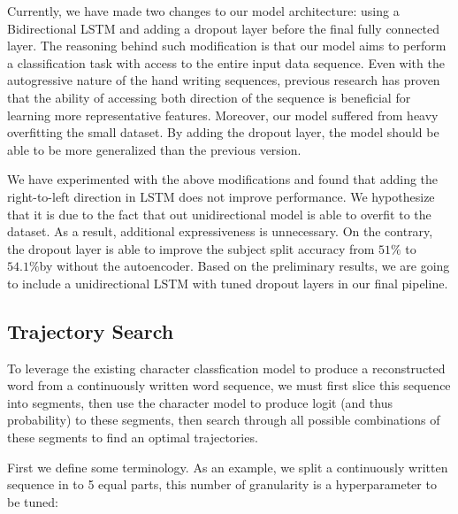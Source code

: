 \documentclass{article}
\begin{document}
\begin{multicols*}{2}
Currently, we have made two changes to our model architecture: using a Bidirectional LSTM and adding a dropout layer before the final fully connected layer. The reasoning behind such modification is that our model aims to perform a classification task with access to the entire input data sequence. Even with the autogressive nature of the hand writing sequences, previous research\cite{bilstm} has proven that the ability of accessing both direction of the sequence is beneficial for learning more representative features. Moreover, our model suffered from heavy overfitting the small dataset. By adding the dropout layer, the model should be able to be more generalized than the previous version.

We have experimented with the above modifications and found that adding the right-to-left direction in LSTM does not improve performance. We hypothesize that it is due to the fact that out unidirectional model is able to overfit to the dataset. As a result, additional expressiveness is unnecessary. On the contrary, the dropout layer is able to improve the subject split accuracy from $51\%$ to $54.1\%$by without the autoencoder. Based on the preliminary results, we are going to include a unidirectional LSTM with tuned dropout layers in our final pipeline.

\subsection{Trajectory Search}

To leverage the existing character classfication model to produce a reconstructed word from a continuously written word sequence, we must first slice this sequence into segments, then use the character model to produce logit (and thus probability) to these segments, then search through all possible combinations of these segments to find an optimal trajectories. 

First we define some terminology. As an example, we split a continuously written sequence in to 5 equal parts, this number of granularity is a hyperparameter to be tuned:


\end{multicols*}
\end{document}
